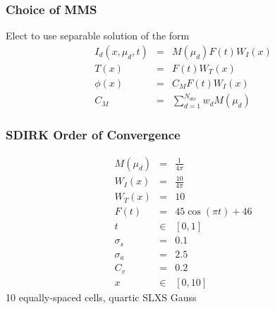 \documentclass{beamer}
\newcommand{\bea}{\begin{eqnarray*}}  %
\newcommand{\eea}{\end{eqnarray*}}
\newcommand{\beanum}{\begin{eqnarray}}  %
\newcommand{\eeanum}{\end{eqnarray}}
\begin{document}
\begin{frame}
\frametitle{Choice of MMS}
Elect to use separable solution of the form
\beanum
I_d(x,\mu_d,t) &=& M(\mu_d) F(t) W_I(x) \\
T(x) &=& F(t) W_T(x) \\
\phi(x) &=& C_M F(t) W_I(x) \\
C_M &=& \sum_{d=1}^{N_{dir}} { w_d M(\mu_d) }
\eeanum
\end{frame}


\begin{frame}
\frametitle{SDIRK Order of Convergence}
\bea
M(\mu_d) &=& \frac{1}{4\pi} \\
W_I(x) &=& \frac{10}{4\pi} \\
W_T(x) &=&  10 \\
F(t) &=& 45 \cos\left( \pi t \right) + 46 \\
t &\in&[0,1] \\
\sigma_s &=& 0.1\\
\sigma_a &=& 2.5\\
C_v &=& 0.2 \\
x &\in & [0,10]
\eea
10 equally-spaced cells, quartic SLXS Gauss
\end{frame}
\end{document}
